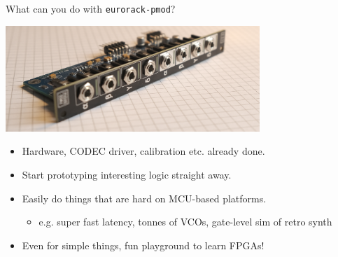 \documentclass[aspectratio=169]{beamer}
\begin{document}


\begin{frame}{What can you do with \texttt{eurorack-pmod}?}
    \begin{center}
        \includegraphics[height=4cm]{img/frontconndof.png}
    \end{center}
    \begin{itemize}
        \item Hardware, CODEC driver, calibration etc. already done.
        \item Start prototyping interesting logic straight away.
        \item Easily do things that are hard on MCU-based platforms.
            \begin{itemize}
                \item e.g. super fast latency, tonnes of VCOs, gate-level sim of retro synth
            \end{itemize}
        \item Even for simple things, fun playground to learn FPGAs!
    \end{itemize}
\end{frame}
\end{document}
